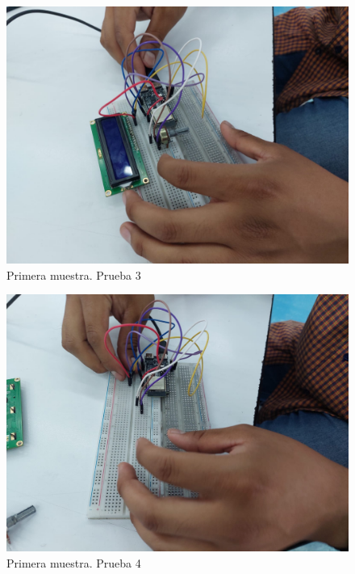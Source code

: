\begin{figure}[H]
        \centering
        \includegraphics[trim = {30mm 30mm 30mm 30mm},clip,scale=0.2]{10/Img/muestra1Prueba3.jpg}
        \caption{Primera muestra. Prueba 3}
        \label{Prueba 3}
    \end{figure}

\begin{figure}[H]
        \centering
        \includegraphics[trim = {30mm 30mm 80mm 30mm},clip,scale=0.2]{10/Img/muestra1Prueba4.jpg}
        \caption{Primera muestra. Prueba 4}
        \label{Prueba 4}
    \end{figure}

